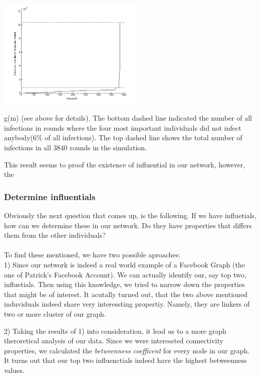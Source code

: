 \begin{minipage}{0.5\textwidth}
\includegraphics[width=7cm]{influ3}
\end{minipage}
\begin{minipage}{0.5\textwidth}
\caption{ g(m) (see above for details). The bottom dashed line indicated the number of all infections in rounds where the four most important individuals did not infect anybody(6\% of all infections). The top dashed line shows the total number of infections in all 3840 rounds in the simulation.}
\label{importancedist}
\end{minipage}

This result seems to proof the existence of influential in our network, however, the


\clearpage

\subsubsection{Determine influentials}

Obviously the next question that comes up, is the following. If we have influetials, how can we determine these in our network. Do they have properties that differs them from the other individuals? \\ 
\\
To find these mentioned, we have two possible aproaches: 
\\

1) Since our network is indeed a real world example of a Facebook Graph (the one of Patrick's Facebook Account). We can actually identify our, say top two, influetials. Then using this knowledge, we tried to narrow down the properties that might be of interest. 
It acutally turned out, that the two above mentioned induviduals indeed share very interessting propertiy. Namely, they are linkers of two or more cluster of our graph. 

2) Taking the results of 1) into consideration, it lead us to a more graph theroretical analysis of our data. Since we were interessted connectivity properties, we calculated the \textit{betweenness coefficent} for every node in our graph. 
It turns out that our top two influenctials indeed have the highest betweenness values. 

